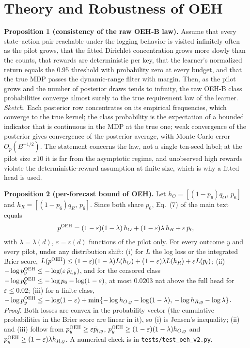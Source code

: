 \section{Theory and Robustness of OEH}
\label{supp:v2}
\textbf{Proposition 1 (consistency of the raw OEH-B law).} Assume that every state--action pair reachable under the logging behavior is visited infinitely often as the pilot grows, that the fitted Dirichlet concentration grows more slowly than the counts, that rewards are deterministic per key, that the learner's normalized return equals the 0.95 threshold with probability zero at every budget, and that the true MDP passes the dynamic-range filter with margin. Then, as the pilot grows and the number of posterior draws tends to infinity, the raw OEH-B class probabilities converge almost surely to the true requirement law of the learner. \emph{Sketch.} Each posterior row concentrates on its empirical frequencies, which converge to the true kernel; the class probability is the expectation of a bounded indicator that is continuous in the MDP at the true one; weak convergence of the posterior gives convergence of the posterior average, with Monte Carlo error $O_p(B^{-1/2})$. The statement concerns the law, not a single ten-seed label; at the pilot size $x10$ it is far from the asymptotic regime, and unobserved high rewards violate the deterministic-reward assumption at finite size, which is why a fitted head is used.

\textbf{Proposition 2 (per-forecast bound of OEH).} Let $h_O=[(1-p_6)q_O,\,p_6]$ and $h_R=[(1-p_6)q_R,\,p_6]$. Since both share $p_6$, Eq.~(7) of the main text equals
\begin{equation*}
p^{\textsc{OEH}}=(1-\varepsilon)(1-\lambda)\,h_O+(1-\varepsilon)\lambda\,h_R+\varepsilon\,\bar p_l,
\end{equation*}
with $\lambda=\lambda(d)$, $\varepsilon=\varepsilon(d)$ functions of the pilot only. For every outcome $y$ and every pilot, under any distribution shift: (i) for $L$ the log loss or the integrated Brier score, $L(p^{\textsc{OEH}})\le(1-\varepsilon)(1-\lambda)L(h_O)+(1-\varepsilon)\lambda L(h_R)+\varepsilon L(\bar p_l)$; (ii) $-\log p^{\textsc{OEH}}_y\le-\log(\varepsilon\,\bar p_{l,y})$, and for the censored class $-\log p^{\textsc{OEH}}_6\le-\log p_6-\log(1-\varepsilon)$, at most $0.0203$ nat above the full head for $\varepsilon\le0.02$; (iii) for a finite class, $-\log p^{\textsc{OEH}}_y\le-\log(1-\varepsilon)+\min\{-\log h_{O,y}-\log(1-\lambda),\,-\log h_{R,y}-\log\lambda\}$. \emph{Proof.} Both losses are convex in the probability vector (the cumulative probabilities in the Brier score are linear in it), so (i) is Jensen's inequality; (ii) and (iii) follow from $p^{\textsc{OEH}}_y\ge\varepsilon\bar p_{l,y}$, $p^{\textsc{OEH}}_y\ge(1-\varepsilon)(1-\lambda)h_{O,y}$ and $p^{\textsc{OEH}}_y\ge(1-\varepsilon)\lambda h_{R,y}$. A numerical check is in \texttt{tests/test\_oeh\_v2.py}.

